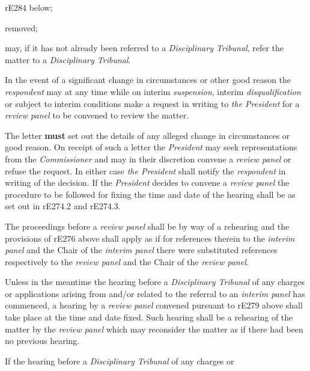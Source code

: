 rE284 below;\\
\item  removed;\item may, if it has not already been referred to a \emph{Disciplinary
Tribunal}, refer the matter to a \emph{Disciplinary Tribunal}.\la\ln
{}\par
{}
In the event of a significant change in circumstances or other good
reason the \emph{respondent} may at any time while on
interim \emph{suspension}, interim \emph{disqualification} or subject to
interim conditions make a request in writing to \emph{the President} for
a \emph{review panel} to be convened to review the matter.\\
\par
The letter  \textcolor{myred}{\textbf{must}} set out the details of any alleged change in
circumstances or good reason.  On receipt of such a letter
the \emph{President} may seek representations from
the \emph{Commissioner }and may in their discretion convene
a \emph{review panel} or refuse the request. In either case \emph{the
President} shall notify the \emph{respondent} in writing of the
decision. If the \emph{President} decides to convene a \emph{review
panel} the procedure to be followed for fixing the time and date of the
hearing shall be as set out in rE274.2 and rE274.3.\\
\par
The proceedings before a \emph{review panel} shall be by way of a
rehearing and the provisions of \textbf{ } rE276 above shall apply as if
for references therein to the \emph{interim panel} and the Chair of
the \emph{interim panel} there were substituted references respectively
to the \emph{review panel} and the Chair of the \emph{review panel}.\\
\par
Unless in the meantime the hearing before a \emph{Disciplinary
Tribunal} of any charges or applications arising from and/or related to
the referral to an \emph{interim panel} has commenced, a hearing by
a \emph{review panel} convened pursuant to rE279 above shall take place
at the time and date fixed. Such hearing shall be a rehearing of the
matter by the \emph{review panel} which may reconsider the matter as if
there had been no previous hearing.\\
\par
If the hearing before a \emph{Disciplinary Tribunal} of any charges or
